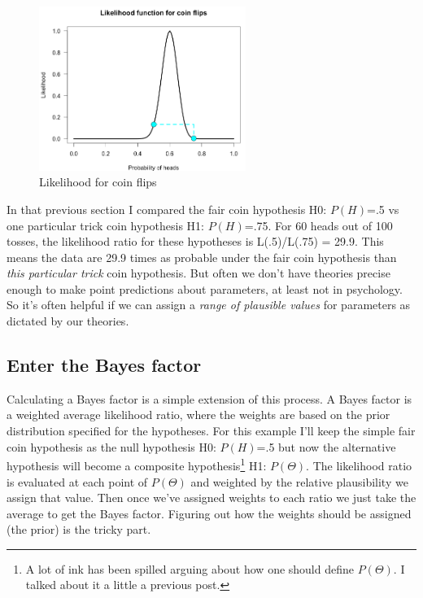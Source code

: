 \begin{figure}[h]
    \centering
\includegraphics[width=0.6\textwidth]{pic/p05c03-snip13.png}
    \caption{Likelihood for coin flips}
    \label{fig:p05c03-snip13}
\end{figure}

In that previous section I compared the fair coin hypothesis H0: $P(H)$=.5 vs one particular trick coin hypothesis H1: $P(H)$=.75. For 60 heads out of 100 tosses, the likelihood ratio for these hypotheses is L(.5)/L(.75) = 29.9. This means the data are 29.9 times as probable under the fair coin hypothesis than  \textit{this particular trick}  coin hypothesis. But often we don't have theories precise enough to make point predictions about parameters, at least not in psychology. So it's often helpful if we can assign a \textit{range of plausible values} for parameters as dictated by our theories.

\subsection{Enter the Bayes factor}

Calculating a Bayes factor is a simple extension of this process. A Bayes factor is a weighted average likelihood ratio, where the weights are based on the prior distribution specified for the hypotheses. For this example I'll keep the simple fair coin hypothesis as the null hypothesis  H0: $P(H)$=.5  but now the alternative hypothesis will become a composite hypothesis\footnote{A lot of ink has been spilled arguing about how one should define $P(\Theta)$. I talked about it a little a previous post.}  H1: $P(\Theta)$. The likelihood ratio is evaluated at each point of $P(\Theta)$ and weighted by the relative plausibility we assign that value. Then once we've assigned weights to each ratio we just take the average to get the Bayes factor. Figuring out how the weights should be assigned (the prior) is the tricky part.

